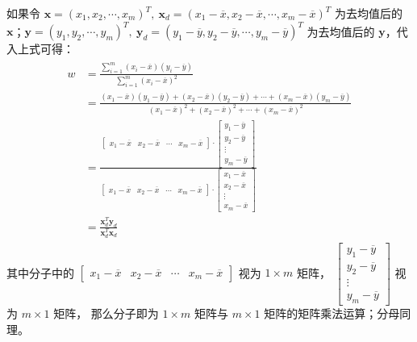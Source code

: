 \documentclass[../studies-ml.tex]{subfiles}
\begin{document}
\begin{anote}
  如果令 $\pmb{x} = (x_1,x_2,\cdots,x_m)^T,\ \pmb{x}_d = (x_1-\overline{x},x_2-\overline{x},\cdots,x_m-\overline{x})^T$ 为去均值后的
  $\pmb{x}$；$\pmb{y} = (y_1,y_2,\cdots,y_m)^T,\ \pmb{y}_d = (y_1-\overline{y},y_2-\overline{y},\cdots,y_m-\overline{y})^T$
  为去均值后的 $\pmb{y}$，代入上式可得：
  \begin{align*}
    \begin{split}
      w & = \frac{\sum\limits_{i=1}^{m}(x_i-\overline{x})(y_i-\overline{y})}{\sum\limits_{i=1}^{m}(x_i - \overline{x})^2} \\
      & = \frac{(x_1-\overline{x})(y_1-\overline{y})+(x_2-\overline{x})(y_2-\overline{y})+\cdots+(x_m-\overline{x})(y_m-\overline{y})}
      {(x_1-\overline{x})^2+(x_2-\overline{x})^2+\cdots+(x_m-\overline{x})^2} \\
      & = \frac{
        \begin{bmatrix}
          x_1 - \overline{x} & x_2 - \overline{x} & \cdots & x_m - \overline{x}
        \end{bmatrix}
        \cdot
        \begin{bmatrix}
          y_1 - \overline{y} \\ y_2 - \overline{y} \\ \vdots \\ y_m - \overline{y}
        \end{bmatrix}
      }{
        \begin{bmatrix}
          x_1 - \overline{x} & x_2 - \overline{x} & \cdots & x_m - \overline{x}
        \end{bmatrix}
        \cdot
        \begin{bmatrix}
          x_1 - \overline{x} \\ x_2 - \overline{x} \\ \vdots \\ x_m - \overline{x}
        \end{bmatrix}
      } \\
      & = \frac{\pmb{x}_d^T\pmb{y}_d}{\pmb{x}_d^T\pmb{x}_d}
    \end{split}
  \end{align*}
  其中分子中的 $\begin{bmatrix}x_1 - \overline{x} & x_2 - \overline{x} & \cdots & x_m - \overline{x}\end{bmatrix}$ 视为 $1 \times m$ 矩阵，
  $\begin{bmatrix}y_1 - \overline{y} \\ y_2 - \overline{y} \\ \vdots \\ y_m - \overline{y}\end{bmatrix}$ 视为 $m \times 1$ 矩阵，
  那么分子即为 $1 \times m$ 矩阵与 $m \times 1$ 矩阵的矩阵乘法运算；分母同理。
\end{anote}
\end{document}
